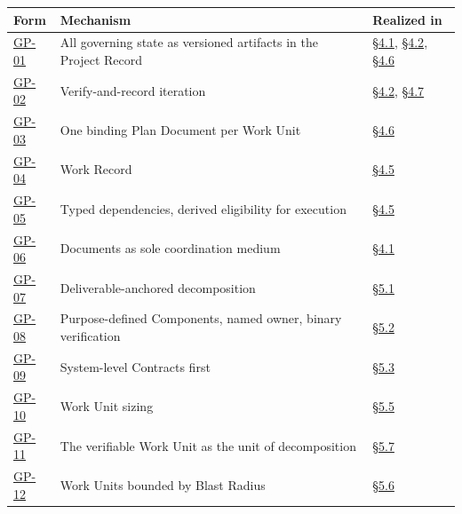 \begingroup\footnotesize

\begin{longtable}{@{}p{} p{} p{}@{}}

\toprule

\textbf{Form} & \textbf{Mechanism} & \textbf{Realized in} \\

\midrule

\endhead

\hyperlink{gp-01}{GP-01} & All governing state as versioned artifacts in the Project Record & \hyperlink{nss-4.1}{\S4.1}, \hyperlink{nss-4.2}{\S4.2}, \hyperlink{nss-4.6}{\S4.6} \\

\hyperlink{gp-02}{GP-02} & Verify-and-record iteration & \hyperlink{nss-4.2}{\S4.2}, \hyperlink{nss-4.7}{\S4.7} \\

\hyperlink{gp-03}{GP-03} & One binding Plan Document per Work Unit & \hyperlink{nss-4.6}{\S4.6} \\

\hyperlink{gp-04}{GP-04} & Work Record & \hyperlink{nss-4.5}{\S4.5} \\

\hyperlink{gp-05}{GP-05} & Typed dependencies, derived eligibility for execution & \hyperlink{nss-4.5}{\S4.5} \\

\hyperlink{gp-06}{GP-06} & Documents as sole coordination medium & \hyperlink{nss-4.1}{\S4.1} \\

\hyperlink{gp-07}{GP-07} & Deliverable-anchored decomposition & \hyperlink{nss-5.1}{\S5.1} \\

\hyperlink{gp-08}{GP-08} & Purpose-defined Components, named owner, binary verification & \hyperlink{nss-5.2}{\S5.2} \\

\hyperlink{gp-09}{GP-09} & System-level Contracts first & \hyperlink{nss-5.3}{\S5.3} \\

\hyperlink{gp-10}{GP-10} & Work Unit sizing & \hyperlink{nss-5.5}{\S5.5} \\

\hyperlink{gp-11}{GP-11} & The verifiable Work Unit as the unit of decomposition & \hyperlink{nss-5.7}{\S5.7} \\

\hyperlink{gp-12}{GP-12} & Work Units bounded by Blast Radius & \hyperlink{nss-5.6}{\S5.6} \\


\end{longtable}
